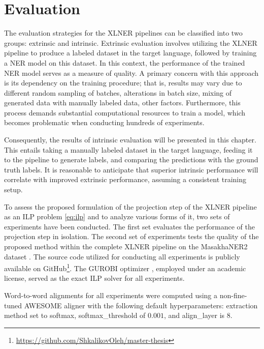 \chapter{Evaluation}
\label{sec:experiments}

The evaluation strategies for the XLNER pipelines can be classified into two groups: extrinsic and
intrinsic. Extrinsic evaluation involves utilizing the XLNER pipeline to produce a
labeled dataset in the target language, followed by training a NER model on this dataset.
In this context, the performance of the trained NER model serves as a measure of quality.
A primary concern with this approach is its dependency on the training procedure; that is,
results may vary due to different random sampling of batches, alterations in batch size,
mixing of generated data with manually labeled data, other factors. Furthermore,
this process demands substantial computational resources to train a model, which becomes
problematic when conducting hundreds of experiments.

Consequently, the results of intrinsic evaluation will be presented in this chapter.
This entails taking a manually labeled dataset in the target language, feeding it to
the pipeline to generate labels, and comparing the predictions with the ground truth
labels. It is reasonable to anticipate that superior intrinsic performance will
correlate with improved extrinsic performance, assuming a consistent training setup.

To assess the proposed formulation of the projection step of the XLNER pipeline as an
ILP problem \eqref{eq:ilp} and to analyze various forms of it, two
sets of experiments have been conducted. The first set evaluates the performance of
the projection step in isolation. The second set of experiments tests the quality
of the proposed method within the complete XLNER pipeline on the MasakhaNER2 dataset
\cite{adelani-etal-2022-masakhaner}. The source code utilized for conducting all
experiments is publicly available on GitHub\footnote{\url{https://github.com/ShkalikovOleh/master-thesis}}.
The GUROBI optimizer \cite{gurobi}, employed under an academic license, served as the exact
ILP solver for all experiments.

Word-to-word alignments for all experiments were computed using a non-fine-tuned
AWESOME \cite{dou-neubig-2021-word} aligner with the following default hyperparameters: extraction method set
to softmax, softmax\_threshold of \( 0.001 \), and align\_layer is \( 8 \).

